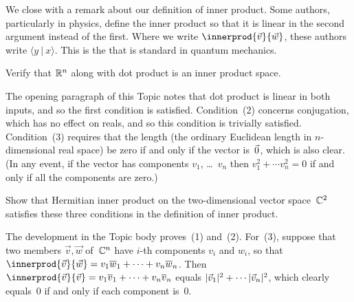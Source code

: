 We close with a remark about our definition of inner product.
Some authors, particularly in physics, define the inner product 
so that it is linear in the second argument instead of the first. 
Where we write $\innerprod{\vec{v}}{\vec{w}}$, 
these authors write $\langle y\ |\ x\rangle$. 
This is the
that is standard in quantum mechanics.

\begin{exercises}
\item 
Verify that $\mathbb{R}^n$ along with dot product is an inner product space.
\begin{answer}
The opening paragraph of this Topic notes that dot product is linear
in both inputs, and so the first condition is satisfied.
Condition~(2) concerns conjugation, 
which has no effect on reals, and 
so this condition is trivially satisfied. 
Condition~(3) requires that the length (the ordinary Euclidean length
in $n$-dimensional real space) be zero if and only if the vector is~$\vec{0}$,
which is also clear.
(In any event, if the vector has components $v_1$, \ldots~$v_n$ then
$v_1^2+\cdots v_n^2=0$ if and only if all the components are zero.) 
\end{answer}

\item
Show that Hermitian inner product on the two-dimensional vector space~$\mathbb{C}^2$ 
satisfies these three conditions in the definition of inner product. 
\begin{answer}
The development in the Topic body proves~(1) and~(2).
For~(3), suppose that 
two members  $\vec{v},\vec{w}$ of~$\mathbb{C}^n$
have $i$-th components $v_i$ and $w_i$, so that
$\innerprod{\vec{v}}{\vec{w}}=v_1\compconj{w}_1+\cdots+v_n\compconj{w}_n$.
Then $\innerprod{\vec{v}}{\vec{v}}=v_1\compconj{v}_1+\cdots+v_n\compconj{v}_n$
equals $\lvert\vec{v}_1\rvert^2+\cdots \lvert\vec{v}_n\rvert^2$, 
which clearly equals~$0$ if and only if each component is~$0$.
\end{answer}


\end{exercises}
